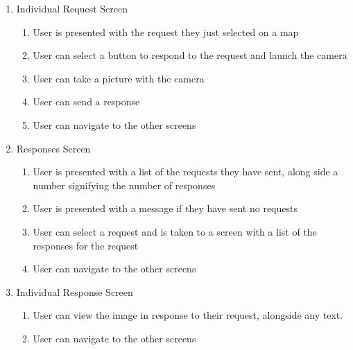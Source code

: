 \documentclass[a4paper]{article}
\begin{document}
\begin{enumerate}
       \item Individual Request Screen
  \begin{enumerate}
  \item User is presented with the request they just selected on a map
    \item User can select a button to respond to the request and launch the camera 
        \item User can take a picture with the camera
     \item User can send a      response
    
              \item User can navigate to the other screens
  \end{enumerate}

   \item Responses Screen
  \begin{enumerate}
  \item User is presented with a list of the requests they have sent, along side a number signifying the number of responses \item User is presented with a message if they have sent no requests  
    \item User can select a request and is taken to a screen with a list of the responses for the request
  
    
      \item User can navigate to the other screens
  \end{enumerate}
    \item Individual Response Screen
  \begin{enumerate}
    
      \item User can view the image in response to their request, alongside any text.
      \item User can navigate to the other screens
  \end{enumerate}


\end{enumerate}
\end{document}

